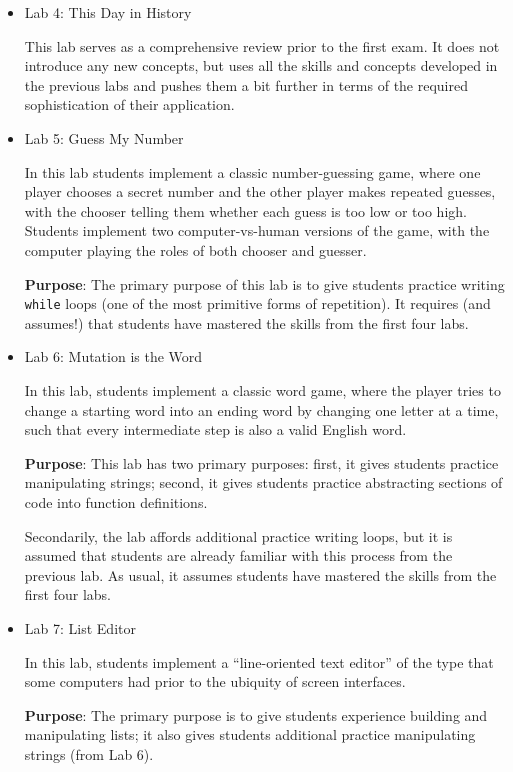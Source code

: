 \documentclass{article}
\begin{document}
\begin{itemize}
\item Lab 4: This Day in History

  This lab serves as a comprehensive review prior to the first exam.
  It does not introduce any new concepts, but uses all the skills and
  concepts developed in the previous labs and pushes them a bit
  further in terms of the required sophistication of their
  application.

\item Lab 5: Guess My Number

  In this lab students implement a classic number-guessing game, where
  one player chooses a secret number and the other player makes
  repeated guesses, with the chooser telling them whether each guess
  is too low or too high.  Students implement two computer-vs-human
  versions of the game, with the computer playing the roles of both
  chooser and guesser.

  \textbf{Purpose}: The primary purpose of this lab is to give
  students practice writing \texttt{while} loops (one of the most
  primitive forms of repetition).  It requires (and assumes!) that
  students have mastered the skills from the first four labs.

\item Lab 6: Mutation is the Word

  In this lab, students implement a classic word game, where the
  player tries to change a starting word into an ending word by
  changing one letter at a time, such that every intermediate step is
  also a valid English word.

  \textbf{Purpose}: This lab has two primary purposes: first, it gives
  students practice manipulating strings; second, it gives students
  practice abstracting sections of code into function definitions.

  Secondarily, the lab affords additional practice writing loops, but
  it is assumed that students are already familiar with this process
  from the previous lab.  As usual, it assumes students have mastered
  the skills from the first four labs.

\item Lab 7: List Editor

  In this lab, students implement a ``line-oriented text editor'' of
  the type that some computers had prior to the ubiquity of screen
  interfaces.

  \textbf{Purpose}: The primary purpose is to give students experience
  building and manipulating lists; it also gives students additional
  practice manipulating strings (from Lab 6).


\end{itemize}
\end{document}
